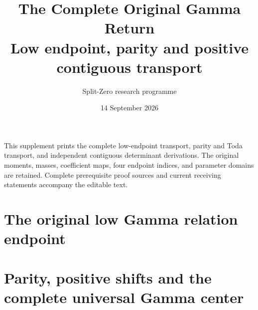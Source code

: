 \documentclass[11pt,a4paper]{article}
\title{The Complete Original Gamma Return\\[3pt]
\large Low endpoint, parity and positive contiguous transport}
\author{Split-Zero research programme}
\date{14 September 2026}
\begin{document}
\maketitle
This supplement prints the complete low-endpoint transport, parity and
Toda transport, and independent contiguous determinant derivations.
The original moments, masses, coefficient maps, four endpoint indices,
and parameter domains are retained. Complete prerequisite proof sources
and current receiving statements accompany the editable text.

\part*{The original low Gamma relation endpoint}

\clearpage
\part*{Parity, positive shifts and the complete universal Gamma center}

\end{document}
